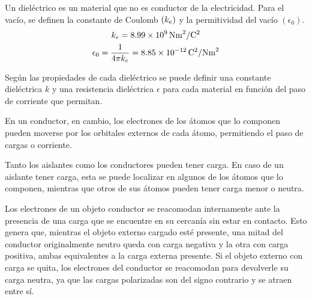 
Un dieléctrico es un material que no es conductor de la electricidad.
Para el vacío, se definen la constante de Coulomb $(k_e)$ y la permitividad del vacío $(\epsilon_0)$.
\begin{gather*}
    k_e=8.99 \times 10^9\,\si{\newton\metre^2\per\coulomb^2}
    \\
    \epsilon_0 = \dfrac{1}{4 \pi k_e} = 8.85 \times 10^{-12} \,\si{\coulomb^2\per\newton\metre^2}
\end{gather*}

Según las propiedades de cada dieléctrico se puede definir una constante dieléctrica $k$ y una resistencia dieléctrica $\epsilon$ para cada material en función del paso de corriente que permitan.

En un conductor, en cambio, los electrones de los átomos que lo componen pueden moverse por los orbitales externos de cada átomo, permitiendo el paso de cargas o corriente.

Tanto los aislantes como los conductores pueden tener carga.
En caso de un aislante tener carga, esta se puede localizar en algunos de los átomos que lo componen, mientras que otros de sus átomos pueden tener carga menor o neutra.


Los electrones de un objeto conductor se reacomodan internamente ante la presencia de una carga que se encuentre en su cercanía sin estar en contacto.
Esto genera que, mientras el objeto externo cargado esté presente, una mitad del conductor originalmente neutro queda con carga negativa y la otra con carga positiva, ambas equivalentes a la carga externa presente.
Si el objeto externo con carga se quita, los electrones del conductor se reacomodan para devolverle su carga neutra, ya que las cargas polarizadas son del signo contrario y se atraen entre sí.

